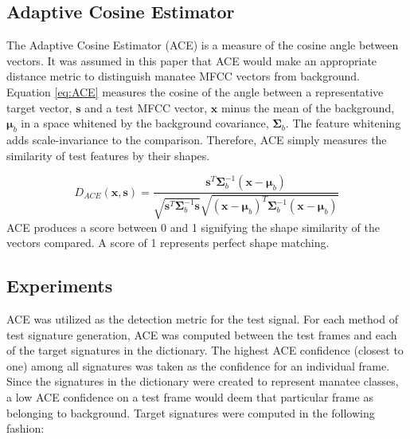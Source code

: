 \documentclass[conference]{IEEEtran}
\begin{document}
	
	\subsection{Adaptive Cosine Estimator}
	The Adaptive Cosine Estimator (ACE) is a measure of the cosine angle between vectors.  It was assumed in this paper that ACE would make an appropriate distance metric to distinguish manatee MFCC vectors from background.  Equation \ref{eq:ACE} measures the cosine of the angle between a representative target vector, $\mathbf{s}$ and a test MFCC vector, $\mathbf{x}$ minus the mean of the background, $\mathbf{\mu}_b$ in a space whitened by the background covariance, $\mathbf{\Sigma}_{b}$.  The feature whitening adds scale-invariance to the comparison. Therefore, ACE simply measures the similarity of test features by their shapes.

	\begin{equation}\label{eq:ACE}
		D_{ACE}(\mathbf{x},\mathbf{s}) = \frac{\mathbf{s}^T\mathbf{\Sigma}_{b}^{-1}(\mathbf{x}-\mathbf{\mu}_b)}{\sqrt{\mathbf{s}^T\mathbf{\Sigma}_{b}^{-1}\mathbf{s}}\sqrt{(\mathbf{x}-\mathbf{\mu}_b)^T\mathbf{\Sigma}_{b}^{-1}(\mathbf{x}-\mathbf{\mu}_b)}}
	\end{equation}
\noindent
ACE produces a score between 0 and 1 signifying the shape similarity of the vectors compared.  A score of 1 represents perfect shape matching.

\subsection{Experiments} \label{Experiments}
ACE was utilized as the detection metric for the test signal.  For each method of test signature generation, ACE was computed between the test frames and each of the target signatures in the dictionary.  The highest ACE confidence (closest to one) among all signatures was taken as the confidence for an individual frame.   Since the signatures in the dictionary were created to represent manatee classes, a low ACE confidence on a test frame would deem that particular frame as belonging to background.  Target signatures were computed in the following fashion:
\end{document}
